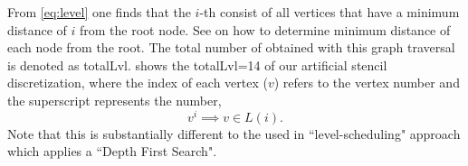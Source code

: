From \cref{eq:level} one finds that the $i$-th \level consist of all vertices that have a minimum distance of $i$ from the root node. See  on how to determine minimum distance of each node from the root. The total number of \levels obtained with this graph traversal is denoted as \acrshort{totalLvl}.  shows the \acrshort{totalLvl}=14 \levels of our artificial stencil discretization, where the index of each vertex ($v$) refers to the vertex number and the superscript represents the \level number, \ie
\begin{equation}\label{eq:node_notation}
	v^i \implies v \in L(i).
\end{equation}
Note that this is substantially different to the \levels used in ``level-scheduling" \cite{saad} approach which applies a ``Depth First Search".

\setlength{\fboxsep}{0pt}%

